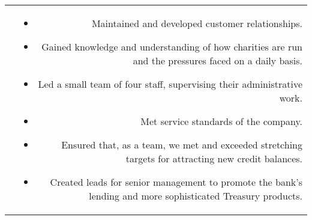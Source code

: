 \documentclass[10pt]{article}
\begin{document}
\begin{flushleft}
\begin{tabular}{L!{\VRule}R}
&\vspace{-2mm}

\begin{itemize} \itemsep1pt \parskip0pt 

\item Maintained and developed customer relationships. 
\item Gained knowledge and understanding of how charities are run and the pressures faced on a daily basis.
\item Led a small team of four staff, supervising their administrative work.
\item Met service standards of the company. 
\item Ensured that, as a team, we met and exceeded stretching targets for attracting new credit balances. 
\item Created leads for senior management to promote the bank’s lending and more sophisticated Treasury products.

\end{itemize}

\end{tabular}


\end{flushleft}
\end{document}
